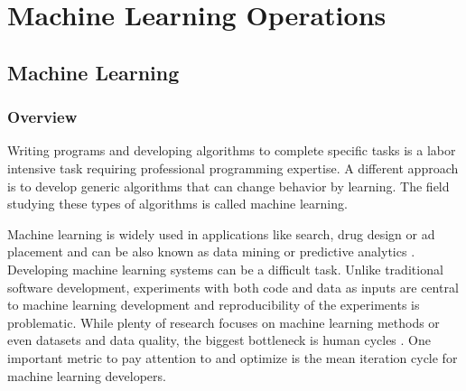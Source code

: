 \chapter{Machine Learning Operations}


\section{Machine Learning}
\label{sec:ml}

\subsection{Overview}

Writing programs and developing algorithms to complete specific tasks is a labor intensive task requiring professional programming expertise. A different approach is to develop generic algorithms that can change behavior by learning. The field studying these types of algorithms is called machine learning.

Machine learning is widely used in applications like search, drug design or ad placement and can be also known as data mining or predictive analytics \parencite{domingosFewUsefulThings2012}. Developing machine learning systems can be a difficult task. Unlike traditional software development, experiments with both code and data as inputs are central to machine learning development \parencite{zahariaAcceleratingMachineLearning2018} and reproducibility of the experiments is problematic. While plenty of research focuses on machine learning methods or even datasets and data quality, the biggest bottleneck is human cycles \parencite{domingosFewUsefulThings2012}. One important metric to pay attention to and optimize is the mean iteration cycle for machine learning developers.



